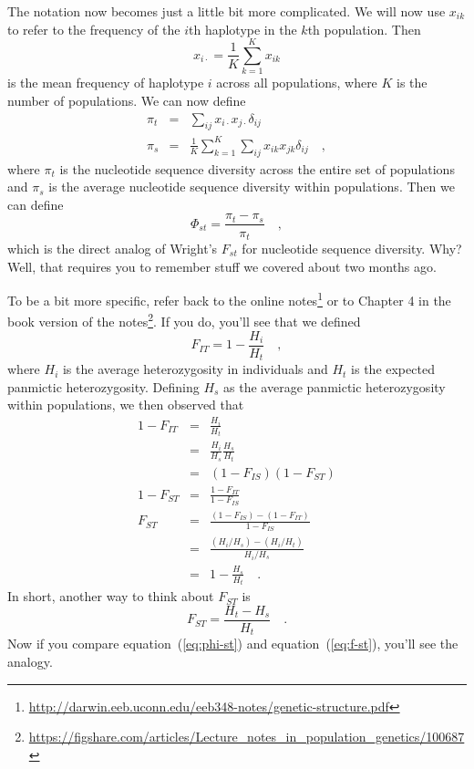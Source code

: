 The notation now becomes just a little bit more complicated. We will
now use $x_{ik}$ to refer to the frequency of the $i$th haplotype in
the $k$th population. Then
\[
x_{i\cdot} = \frac{1}{K}\sum_{k=1}^K x_{ik}
\]
is the mean frequency of haplotype $i$ across all populations, where
$K$ is the number of populations. We can now define
\begin{eqnarray*}
\pi_t &=& \sum_{ij} x_{i\cdot}x_{j\cdot} \delta_{ij} \\
\pi_s &=& \frac{1}{K}\sum_{k=1}^K\sum_{ij} x_{ik}x_{jk}\delta_{ij} \quad ,
\end{eqnarray*}
where $\pi_t$ is the nucleotide sequence diversity across the entire
set of populations and $\pi_s$ is the average nucleotide sequence
diversity within populations. Then we can define
\begin{equation}
\Phi_{st} = \frac{\pi_t - \pi_s}{\pi_t} \quad ,
\label{eq:phi-st}
\end{equation}
which is the direct analog of Wright's $F_{st}$ for nucleotide
sequence diversity. Why? Well, that requires you to remember stuff we
covered about two months ago.

To be a bit more specific, refer back to the online
notes\footnote{\url{http://darwin.eeb.uconn.edu/eeb348-notes/genetic-structure.pdf}}
or to Chapter 4 in the book version of the
notes\footnote{\url{https://figshare.com/articles/Lecture_notes_in_population_genetics/100687}}.
If you do, you'll see that we defined
\[
F_{IT} = 1 - \frac{H_i}{H_t} \quad ,
\]
where $H_i$ is the average heterozygosity in individuals and $H_t$ is
the expected panmictic heterozygosity. Defining $H_s$ as the average
panmictic heterozygosity within populations, we then observed that
\begin{eqnarray*}
1 - F_{IT} &=& \frac{H_i}{H_t} \\
           &=& \frac{H_i}{H_s}\frac{H_s}{H_t} \\
           &=& (1 - F_{IS})(1 - F_{ST}) \\
1-F_{ST} &=& \frac{1-F_{IT}}{1-F_{IS}} \\
F_{ST} &=&
\frac{\left(1-F_{IS}\right)-\left(1-F_{IT}\right)}{1-F_{IS}} \\
&=& \frac{\left(H_i/H_s\right) - \left(H_i/H_t\right)}{H_i/H_s} \\
&=& 1 - \frac{H_s}{H_t} \quad .
\end{eqnarray*}
In short, another way to think about $F_{ST}$ is
\begin{equation}
F_{ST} = \frac{H_t - H_s}{H_t} \quad .
\label{eq:f-st}
\end{equation}
Now if you compare equation~(\ref{eq:phi-st}) and
equation~(\ref{eq:f-st}), you'll see the analogy.

